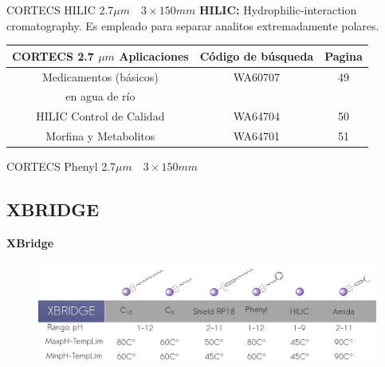 \documentclass[11pt]{beamer}
\begin{document}
        \begin{frame}{CORTECS HILIC 2.7$\mu m \quad 3\times 150 mm$}
            \textbf{HILIC:} Hydrophilic-interaction cromatography. Es empleado para separar analitos extremadamente polares.
            \begin{table}
                \centering
                \begin{tabular}{ccc}
                    CORTECS 2.7 $\mu m$ Aplicaciones &Código de búsqueda & Pagina \\
                    \hline
                    Medicamentos (básicos)& WA60707 &49\\
                    en agua de río&  &\\
                    HILIC Control de Calidad & WA64704 & 50 \\
                    Morfina y Metabolitos  & WA64701 & 51 \\
                    \hline
                \end{tabular}
            \end{table}
        \end{frame}

        \begin{frame}{CORTECS Phenyl 2.7$\mu m \quad 3\times 150 mm$}

        \end{frame}


      \subsection{XBRIDGE}

        \begin{frame}{}
            \begin{center}
                \textbf{\LARGE XBridge}
            \end{center}
            \begin{figure}
                \centering
                \includegraphics[width=1\linewidth]{img/drawing_5}
                \label{fig:drawing5}
            \end{figure}

        \end{frame}
\end{document}
